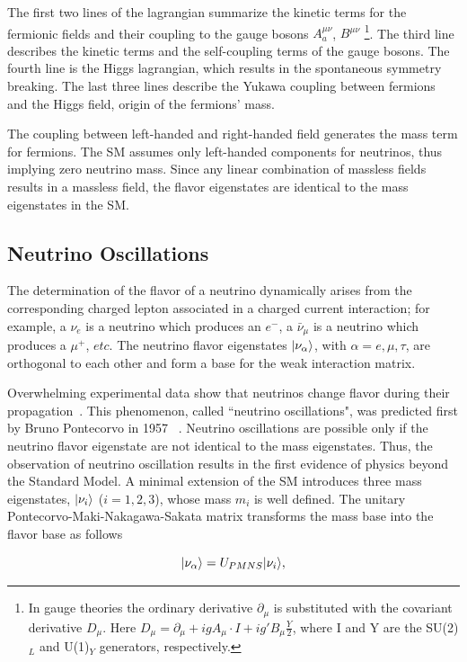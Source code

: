 The first two lines of the lagrangian summarize the kinetic terms for the fermionic fields and their coupling to the gauge bosons $A^{\mu\nu}_a$, $B^{\mu\nu}$ \footnote{In gauge theories the ordinary derivative $\partial_\mu$  is substituted with the covariant derivative $D_\mu$. Here $D_\mu = \partial_\mu + igA_\mu \cdot I + ig'B_\mu\frac{Y}{2}$, where I and Y are the SU(2)$_L$ and U(1)$_Y$ generators, respectively.}.
The third line describes the kinetic terms and the self-coupling terms of the gauge bosons. The fourth line is the Higgs lagrangian, which results in the spontaneous symmetry breaking. The last three lines describe the Yukawa coupling between fermions and the Higgs field, origin of the fermions' mass.

The coupling between left-handed and right-handed field generates the mass term for fermions. The SM assumes only left-handed components for neutrinos, thus implying zero neutrino mass. Since any linear combination of massless fields results in a massless field, the flavor eigenstates are identical to the mass eigenstates in the SM.

\subsection{Neutrino Oscillations}
The determination of the flavor of a neutrino dynamically arises from the corresponding charged lepton associated in a charged current interaction; for example, a $\nu_e$ is a neutrino which produces an $e^-$, a $\bar\nu_\mu$ is a neutrino which produces a $\mu^+$, $etc$. 
The neutrino flavor eigenstates $\lvert\nu_\alpha\rangle$,  with $\alpha = e,\mu,\tau$, are orthogonal to each other and form a base for the weak interaction matrix.

Overwhelming experimental data show that neutrinos change flavor during their propagation~\cite{Patrignani:2016xqp}. This phenomenon, called ``neutrino oscillations",  was predicted first by Bruno Pontecorvo in 1957 ~\cite{Pontecorvo:1967fh}.  Neutrino oscillations are possible only if the neutrino flavor eigenstate are not identical to the mass eigenstates. Thus, the observation of neutrino oscillation results in the first evidence of physics beyond the Standard Model.  A minimal extension of the SM introduces three mass eigenstates, $\lvert\nu_i\rangle$ ($i = 1,2, 3$), whose mass $m_i$ is well defined. 
The unitary Pontecorvo-Maki-Nakagawa-Sakata matrix transforms the mass base into the flavor base as follows

\begin{equation} 
 \lvert\nu_\alpha\rangle =   U_{PMNS} \lvert\nu_i\rangle,
\end{equation}

